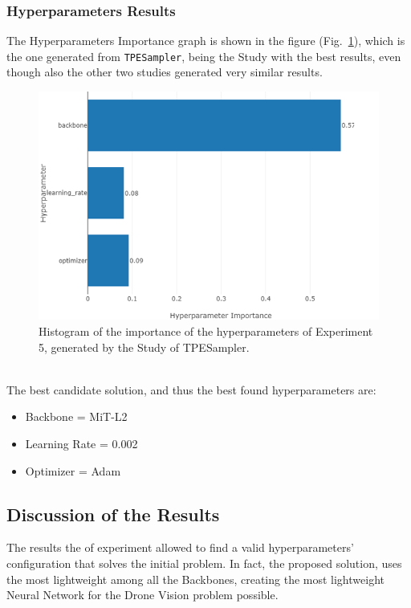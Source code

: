 \subsubsection{Hyperparameters Results}

The Hyperparameters Importance graph is shown in the figure (Fig.~\ref{fig:figure-4.5.5}), which is the one generated from \texttt{TPESampler}, being the Study with the best results, even though also the other two studies generated very similar results.
\begin{figure}[t]
	\centering
	\includegraphics[width=13cm]{figures/figure-4.5.5.png}
	\caption[Hyperparameters Importance Histogram Experiment 5]{Histogram of the importance of the hyperparameters of Experiment 5, generated by the Study of TPESampler.}
	\label{fig:figure-4.5.5}
\end{figure}
\\[0.3cm]The best candidate solution, and thus the best found hyperparameters are:
\begin{itemize}[itemsep=0.1cm]
    \item Backbone = MiT-L2
    \item Learning Rate = 0.002
    \item Optimizer = Adam
\end{itemize}

\subsection{Discussion of the Results}

The results the of experiment allowed to find a valid hyperparameters' configuration that solves the initial problem.
In fact, the proposed solution, uses the most lightweight among all the Backbones, creating the most lightweight Neural Network for the Drone Vision problem possible.


